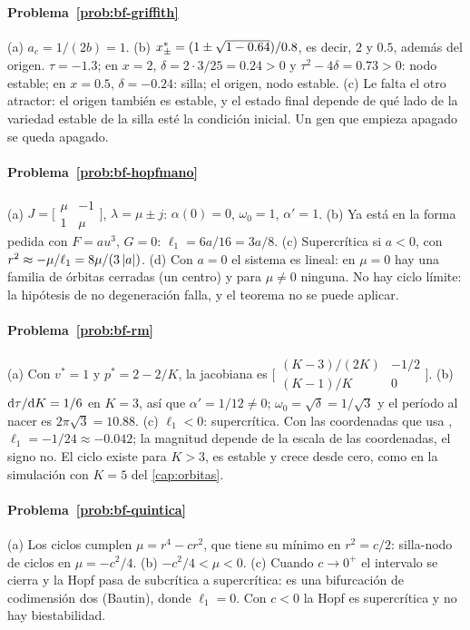 \paragraph{Problema~\ref{prob:bf-griffith}}
(a) $a_c=1/(2b)=1$. (b) $x^{*}_\pm=(1\pm\sqrt{1-0.64})/0.8$, es decir, $2$ y $0.5$, además del origen. $\tau=-1.3$; en $x=2$, $\delta=2\cdot3/25=0.24>0$ y $\tau^2-4\delta=0.73>0$: nodo estable; en $x=0.5$, $\delta=-0.24$: silla; el origen, nodo estable. (c) Le falta el otro atractor: el origen también es estable, y el estado final depende de qué lado de la variedad estable de la silla esté la condición inicial. Un gen que empieza apagado se queda apagado.

\paragraph{Problema~\ref{prob:bf-hopfmano}}
(a) $J=\bigl[\begin{smallmatrix}\mu&-1\\1&\mu\end{smallmatrix}\bigr]$, $\lambda=\mu\pm j$: $\alpha(0)=0$, $\omega_0=1$, $\alpha'=1$. (b) Ya está en la forma pedida con $F=au^3$, $G=0$: $\ell_1=6a/16=3a/8$. (c) Supercrítica si $a<0$, con $r^2\approx-\mu/\ell_1=8\mu/(3\left\lvert a\right\rvert)$. (d) Con $a=0$ el sistema es lineal: en $\mu=0$ hay una familia de órbitas cerradas (un centro) y para $\mu\neq0$ ninguna. No hay ciclo límite: la hipótesis de no degeneración falla, y el teorema no se puede aplicar.

\paragraph{Problema~\ref{prob:bf-rm}}
(a) Con $v^*=1$ y $p^*=2-2/K$, la jacobiana es $\bigl[\begin{smallmatrix}(K-3)/(2K)&-1/2\\(K-1)/K&0\end{smallmatrix}\bigr]$. (b) $\mathrm{d}\tau/\mathrm{d} K=1/6$ en $K=3$, así que $\alpha'=1/12\neq0$; $\omega_0=\sqrt\delta=1/\sqrt3$ y el período al nacer es $2\pi\sqrt3=10.88$. (c) $\ell_1<0$: supercrítica. Con las coordenadas que usa , $\ell_1=-1/24\approx-0.042$; la magnitud depende de la escala de las coordenadas, el signo no. El ciclo existe para $K>3$, es estable y crece desde cero, como en la simulación con $K=5$ del \cref{cap:orbitas}.

\paragraph{Problema~\ref{prob:bf-quintica}}
(a) Los ciclos cumplen $\mu=r^4-cr^2$, que tiene su mínimo en $r^2=c/2$: silla-nodo de ciclos en $\mu=-c^2/4$. (b) $-c^2/4<\mu<0$. (c) Cuando $c\to0^+$ el intervalo se cierra y la Hopf pasa de subcrítica a supercrítica: es una bifurcación de codimensión dos (Bautin), donde $\ell_1=0$. Con $c<0$ la Hopf es supercrítica y no hay biestabilidad.

